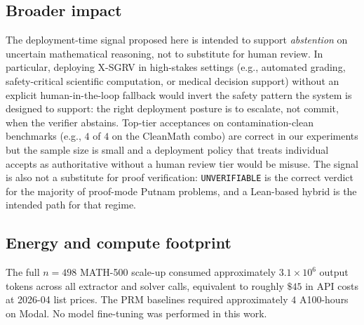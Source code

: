 \documentclass{article}
\begin{document}
\subsection{Broader impact}

The deployment-time signal proposed here is intended to support
\emph{abstention} on uncertain mathematical reasoning, not to
substitute for human review. In particular, deploying X-SGRV in
high-stakes settings (e.g., automated grading, safety-critical
scientific computation, or medical decision support) without an
explicit human-in-the-loop fallback would invert the safety pattern
the system is designed to support: the right deployment posture is
to escalate, not commit, when the verifier abstains. Top-tier
acceptances on contamination-clean benchmarks (e.g., $4$ of $4$ on
the CleanMath combo) are correct in our experiments but the sample
size is small and a deployment policy that treats individual accepts
as authoritative without a human review tier would be misuse.
The signal is also not a substitute for proof verification:
\texttt{UNVERIFIABLE} is the correct verdict for the majority of
proof-mode Putnam problems, and a Lean-based hybrid is the
intended path for that regime.

\subsection{Energy and compute footprint}

The full $n{=}498$ MATH-500 scale-up consumed approximately
$3.1 \times 10^{6}$ output tokens across all extractor and solver
calls, equivalent to roughly $\$$$45$ in API costs at 2026-04
list prices. The PRM baselines required approximately $4$ A100-hours
on Modal. No model fine-tuning was performed in this work.
\end{document}
